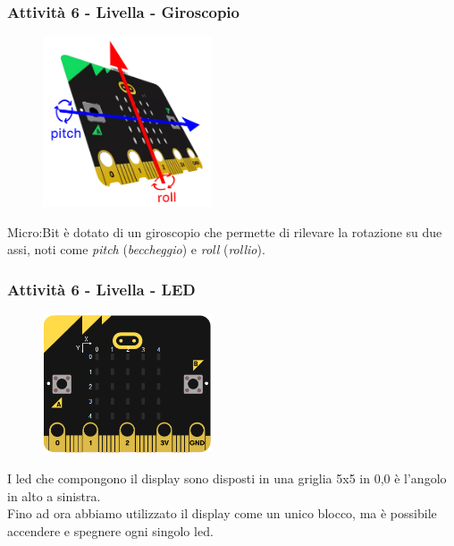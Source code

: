 \documentclass{beamer}
\begin{document}
\begin{frame}
	\frametitle{Attività 6 - Livella - Giroscopio}


	\begin{figure}[h]
		\includegraphics[width=5cm]{mbAxes.png}
	\end{figure}

	Micro:Bit è dotato di un giroscopio che permette di rilevare la rotazione su due assi, noti come \textit{pitch} (\textit{beccheggio}) e \textit{roll} (\textit{rollio}).\\

\end{frame}

\begin{frame}
	\frametitle{Attività 6 - Livella - LED}

	\begin{figure}[h]
		\includegraphics[width=5cm]{mbLedGrid.png}
	\end{figure}

	I led che compongono il display sono disposti in una griglia 5x5 in 0,0 è l'angolo in alto a sinistra.\\
	Fino ad ora abbiamo utilizzato il display come un unico blocco, ma è possibile accendere e spegnere ogni singolo led.

\end{frame}
\end{document}
